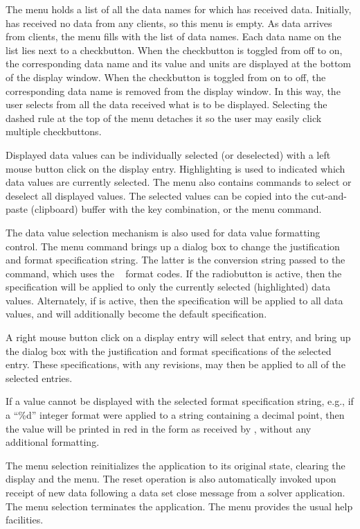 The  menu holds a list of all the data names for which
 has received data.  Initially,  has
received no data from any clients, so this menu is empty.  As data
arrives from clients, the menu fills with the list of data names.
Each data name on the list lies next to a checkbutton.  When the
checkbutton is toggled from off to on, the corresponding data name and
its value and units are displayed at the bottom of the display window.
When the checkbutton is toggled from on to off, the corresponding data
name is removed from the display window.  In this way, the user
selects from all the data received what is to be displayed.  Selecting
the dashed rule at the top of the  menu detaches it so the
user may easily click multiple checkbuttons.

Displayed data values can be individually selected (or deselected) with
a left mouse button click on the display entry.  Highlighting is used to
indicated which data values are currently selected.  The {}
menu also contains commands to select or deselect all displayed values.
The selected values can be copied into the
cut-and-paste (clipboard) buffer with the
 key combination, or the {} menu
command.

The data value selection mechanism is also used for data value
formatting control.  The  menu command brings
up a  dialog box to change the justification and format
specification string.  The latter is the conversion string passed to
the \Tcl\  command, which uses the \C\  format
codes.  If the {} radiobutton is active, then the
specification will be applied to only the currently selected
(highlighted) data values.  Alternately, if {} is
active, then the specification will be applied to all data values,
and will additionally become the default specification.

A right mouse button click on a display entry will select that entry,
and bring up the  dialog box with the justification and
format specifications of the selected entry.  These specifications, with
any revisions, may then be applied to all of the selected entries.

If a value cannot be displayed with the selected format specification
string, e.g., if a ``\%d'' integer format were applied to a string
containing a decimal point, then the value will be printed in red
in the form as received by , without any additional
formatting.

The menu selection  reinitializes the
 application to its original state, clearing the
display and the  menu.  The reset operation is also
automatically invoked upon receipt of new data following a data set
close message from a solver application.  The menu selection
 terminates the application.  The menu 
provides the usual help facilities.
